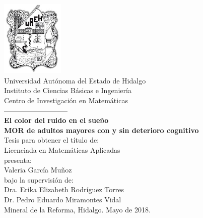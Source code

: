 \documentclass[letterpaper,titlepage,12pt,draft]{report}
\begin{document}
\sloppy %

\begin{center}
\includegraphics[width=3cm]{Escudo.jpg}\\
\textsf{Universidad Aut\'onoma del Estado de Hidalgo}\\
\textsf{Instituto de Ciencias B\'asicas e Ingenier\'ia}\\
\textsf{Centro de Investigaci\'on en Matem\'aticas}\\
\textsf{---------------------------}\\
\vspace{1cm} {\Huge {\bf El color del ruido en el sue\~no}}\\
\vspace{2mm}   {\Huge {\bf MOR de adultos mayores con y sin deterioro cognitivo}}\\
\vspace{1cm} {Tesis para obtener el t\'itulo de:}\\
\vspace{0.5cm} {\Large Licenciada en Matem\'aticas Aplicadas}\\
\vspace{1cm} {presenta:}\\
\vspace{0.5cm} {\Large Valeria Garc\'ia Mu\~noz}\\
\vspace{1cm} {bajo la supervisi\'on de:}\\ 
\vspace{0.3cm} {\large Dra. Erika Elizabeth Rodr\'iguez Torres}\\
\vspace{3mm} {\large Dr. Pedro Eduardo Miramontes Vidal}\\
\vspace{1cm} {\textsc Mineral de la Reforma, Hidalgo. Mayo de 2018.}
\end{center}


\newpage
\end{document}
